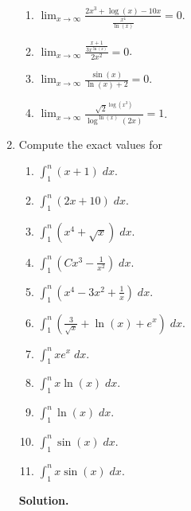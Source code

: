 \documentclass[9pt]{article}
\newcommand{\D}{\displaystyle}
\begin{document}
\begin{enumerate}
\begin{enumerate}
         \item $\D\lim_{x \rightarrow \infty}\frac{2x^3 + \log(x) - 10x}
                  {\D\frac{x^4}{\ln(x)}} = 0$.
         \item $\D\lim_{x \rightarrow \infty}
                  \frac{\D\frac{x+1}{3x^{\ln(x)}}}{2x^2} = 0$.
         \item $\D\lim_{x \rightarrow \infty}\frac{\sin(x)}{\ln(x) + 2} = 0$.
         \item $\D\lim_{x \rightarrow \infty}\frac{\sqrt{2}^{\log(x^3)}}
                  {\log^{\ln(x)}(2x)} = 1$.
      \end{enumerate}
   \item Compute the exact values for

         \begin{enumerate}
            \item $\D\int_1^n(x + 1)\;dx$.
            \item $\D\int_1^n(2x + 10)\;dx$.
            \item $\D\int_1^n(x^4 + \sqrt{x})\;dx$.
            \item $\D\int_1^n\left(Cx^3 - \frac{1}{x^2}\right)\;dx$.
            \item $\D\int_1^n\left(x^4 - 3x^2 + \frac{1}{x}\right)\;dx$.
            \item $\D\int_1^n\left(\frac{3}{\sqrt{x}} +\ln(x) + e^x\right)\;dx$.
            \item $\D\int_1^nxe^x\;dx$.
            \item $\D\int_1^nx\ln(x)\;dx$.
            \item $\D\int_1^n\ln(x)\;dx$.
            \item $\D\int_1^n\sin(x)\;dx$.
            \item $\D\int_1^nx\sin(x)\;dx$.
         \end{enumerate}
      
      \textbf{Solution.}


\end{enumerate}
\end{document}
